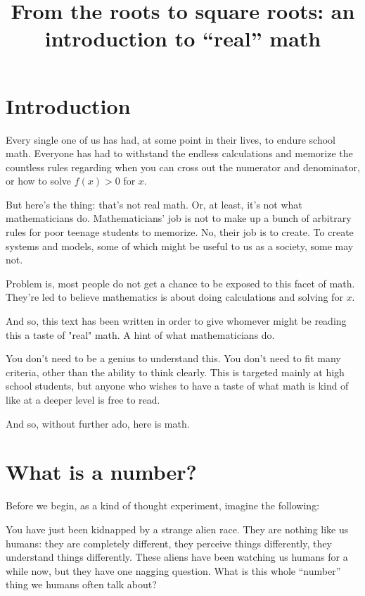 \documentclass[12pt,a4paper]{article}
\title{From the roots to square roots: an introduction to ``real'' math}
\theoremstyle{definition}
\theoremstyle{definition}
\theoremstyle{plain}
\theoremstyle{plain}
\begin{document}
	\maketitle
	
	\section{Introduction}
	
	Every single one of us has had, at some point in their lives, to endure school math. Everyone has had to withstand the endless calculations and memorize the countless rules regarding when you can cross out the numerator and denominator, or how to solve $f(x)>0$ for $x$.
	
	But here's the thing: that's not real math. Or, at least, it's not what mathematicians do. Mathematicians' job is not to make up a bunch of arbitrary rules for poor teenage students to memorize. No, their job is to create. To create systems and models, some of which might be useful to us as a society, some may not.
	
	Problem is, most people do not get a chance to be exposed to this facet of math. They're led to believe mathematics is about doing calculations and solving for $x$.
	
	And so, this text has been written in order to give whomever might be reading this a taste of "real" math. A hint of what mathematicians do.
	
	You don't need to be a genius to understand this. You don't need to fit many criteria, other than the ability to think clearly. This is targeted mainly at high school students, but anyone who wishes to have a taste of what math is kind of like at a deeper level is free to read.
	
	And so, without further ado, here is math.
	
	\section{What is a number?}
	
	Before we begin, as a kind of thought experiment, imagine the following:
	
	You have just been kidnapped by a strange alien race. They are nothing like us humans: they are completely different, they perceive things differently, they understand things differently. These aliens have been watching us humans for a while now, but they have one nagging question. What is this whole ``number'' thing we humans often talk about?
	
\end{document}
